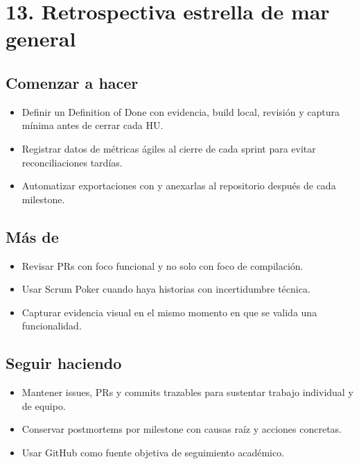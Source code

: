 \documentclass[11pt,a4paper]{article}
\begin{document}
\section{13. Retrospectiva estrella de mar general}

\subsection{Comenzar a hacer}

\begin{itemize}[leftmargin=1.5em]
\item Definir un Definition of Done con evidencia, build local, revisión y captura mínima antes de cerrar cada HU.
\item Registrar datos de métricas ágiles al cierre de cada sprint para evitar reconciliaciones tardías.
\item Automatizar exportaciones con \texttt{} y anexarlas al repositorio después de cada milestone.
\end{itemize}

\subsection{Más de}

\begin{itemize}[leftmargin=1.5em]
\item Revisar PRs con foco funcional y no solo con foco de compilación.
\item Usar Scrum Poker cuando haya historias con incertidumbre técnica.
\item Capturar evidencia visual en el mismo momento en que se valida una funcionalidad.
\end{itemize}

\subsection{Seguir haciendo}

\begin{itemize}[leftmargin=1.5em]
\item Mantener issues, PRs y commits trazables para sustentar trabajo individual y de equipo.
\item Conservar postmortems por milestone con causas raíz y acciones concretas.
\item Usar GitHub como fuente objetiva de seguimiento académico.
\end{itemize}
\end{document}
